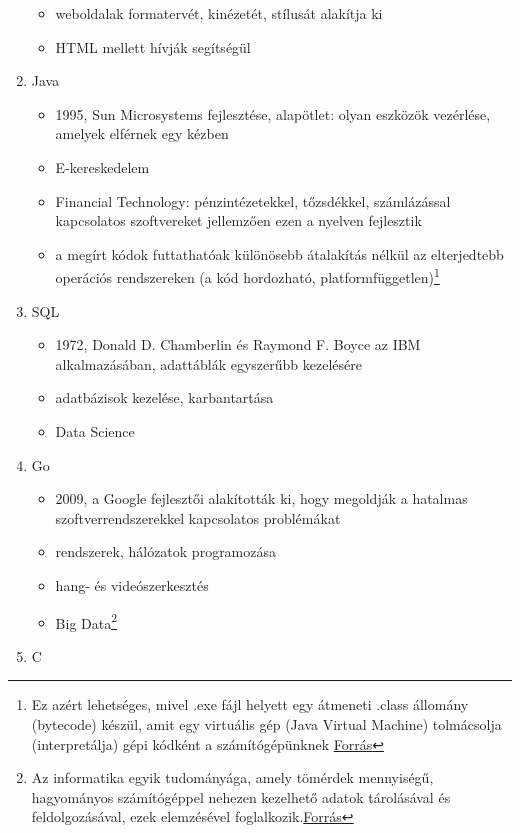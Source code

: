 \documentclass[tocnopagenum]{thesis-ekf}
\theoremstyle{definition}
\theoremstyle{remark}
\begin{document}
\begin{enumerate}
\begin{itemize}
			\item weboldalak formatervét, kinézetét, stílusát alakítja ki
			\item HTML mellett hívják segítségül
		\end{itemize}
		\item Java
		\begin{itemize}
			\item 1995, Sun Microsystems fejlesztése, alapötlet: olyan eszközök vezérlése, amelyek elférnek egy kézben
			\item E-kereskedelem
			\item Financial Technology: pénzintézetekkel, tőzsdékkel, számlázással kapcsolatos szoftvereket jellemzően ezen a nyelven fejlesztik
			\item a megírt kódok futtathatóak különösebb átalakítás nélkül az elterjedtebb operációs rendszereken (a kód hordozható, platformfüggetlen)\footnote{Ez azért lehetséges, mivel .exe fájl helyett egy átmeneti .class állomány (bytecode) készül, amit egy virtuális gép (Java Virtual Machine) tolmácsolja (interpretálja) gépi kódként a számítógépünknek \hyperref{https://www.upgrad.com/blog/why-is-java-platform-independent-language/}{}{}{Forrás}}
		\end{itemize}
		\item SQL
		\begin{itemize}
			\item 1972, Donald D. Chamberlin és Raymond F. Boyce az IBM alkalmazásában, adattáblák egyszerűbb kezelésére
			\item adatbázisok kezelése, karbantartása
			\item Data Science
		\end{itemize}
		\item Go
		\begin{itemize}
			\item 2009, a Google fejlesztői alakították ki, hogy megoldják a hatalmas szoftverrendszerekkel kapcsolatos problémákat
			\item rendszerek, hálózatok programozása
			\item hang- és videószerkesztés
			\item Big Data\footnote{Az informatika egyik tudományága, amely tömérdek mennyiségű, hagyományos számítógéppel nehezen kezelhető adatok tárolásával és feldolgozásával, ezek elemzésével foglalkozik.\hyperref{{https://www.youtube.com/watch?v=bAyrObl7TYE}}{}{}{Forrás}}
		\end{itemize}
		\item C
		\begin{itemize}

\end{itemize}
\end{enumerate}
\end{document}

